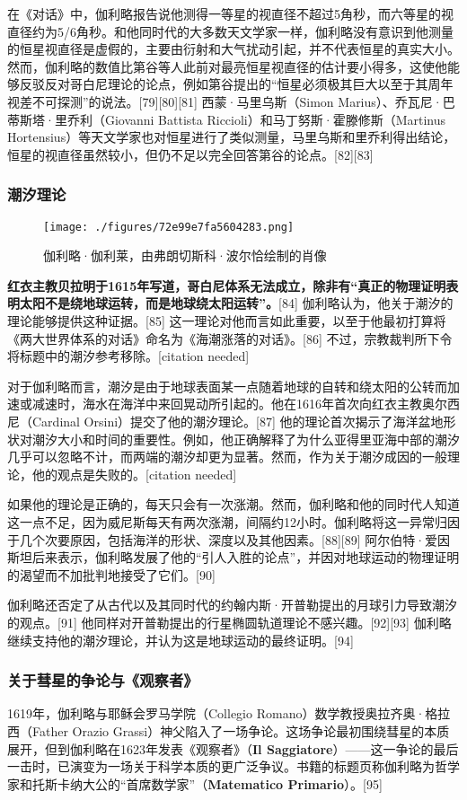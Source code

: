 在《对话》中，伽利略报告说他测得一等星的视直径不超过5角秒，而六等星的视直径约为5/6角秒。和他同时代的大多数天文学家一样，伽利略没有意识到他测量的恒星视直径是虚假的，主要由衍射和大气扰动引起，并不代表恒星的真实大小。然而，伽利略的数值比第谷等人此前对最亮恒星视直径的估计要小得多，这使他能够反驳反对哥白尼理论的论点，例如第谷提出的“恒星必须极其巨大以至于其周年视差不可探测”的说法。[79][80][81] 西蒙·马里乌斯（Simon Marius）、乔瓦尼·巴蒂斯塔·里乔利（Giovanni Battista Riccioli）和马丁努斯·霍滕修斯（Martinus Hortensius）等天文学家也对恒星进行了类似测量，马里乌斯和里乔利得出结论，恒星的视直径虽然较小，但仍不足以完全回答第谷的论点。[82][83]
\subsubsection{潮汐理论}
\begin{figure}[ht]
\centering
\texttt{[image: ./figures/72e99e7fa5604283.png]}
\caption{伽利略·伽利莱，由弗朗切斯科·波尔恰绘制的肖像} \label{fig_JLL_7}
\end{figure}
\textbf{红衣主教贝拉明于1615年写道，哥白尼体系无法成立，除非有“真正的物理证明表明太阳不是绕地球运转，而是地球绕太阳运转”。}[84] 伽利略认为，他关于潮汐的理论能够提供这种证据。[85] 这一理论对他而言如此重要，以至于他最初打算将《两大世界体系的对话》命名为《海潮涨落的对话》。[86] 不过，宗教裁判所下令将标题中的潮汐参考移除。[citation needed]

对于伽利略而言，潮汐是由于地球表面某一点随着地球的自转和绕太阳的公转而加速或减速时，海水在海洋中来回晃动所引起的。他在1616年首次向红衣主教奥尔西尼（Cardinal Orsini）提交了他的潮汐理论。[87] 他的理论首次揭示了海洋盆地形状对潮汐大小和时间的重要性。例如，他正确解释了为什么亚得里亚海中部的潮汐几乎可以忽略不计，而两端的潮汐却更为显著。然而，作为关于潮汐成因的一般理论，他的观点是失败的。[citation needed]

如果他的理论是正确的，每天只会有一次涨潮。然而，伽利略和他的同时代人知道这一点不足，因为威尼斯每天有两次涨潮，间隔约12小时。伽利略将这一异常归因于几个次要原因，包括海洋的形状、深度以及其他因素。[88][89] 阿尔伯特·爱因斯坦后来表示，伽利略发展了他的“引人入胜的论点”，并因对地球运动的物理证明的渴望而不加批判地接受了它们。[90]  

伽利略还否定了从古代以及其同时代的约翰内斯·开普勒提出的月球引力导致潮汐的观点。[91] 他同样对开普勒提出的行星椭圆轨道理论不感兴趣。[92][93] 伽利略继续支持他的潮汐理论，并认为这是地球运动的最终证明。[94]
\subsubsection{关于彗星的争论与《观察者》} 
1619年，伽利略与耶稣会罗马学院（Collegio Romano）数学教授奥拉齐奥·格拉西（Father Orazio Grassi）神父陷入了一场争论。这场争论最初围绕彗星的本质展开，但到伽利略在1623年发表《观察者》（\textbf{Il Saggiatore}）——这一争论的最后一击时，已演变为一场关于科学本质的更广泛争议。书籍的标题页称伽利略为哲学家和托斯卡纳大公的“首席数学家”（\textbf{Matematico Primario}）。[95]  

